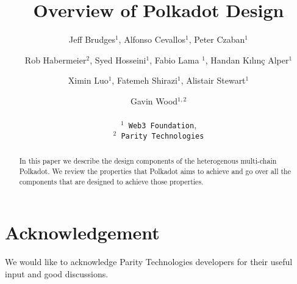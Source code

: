 \documentclass{article}
\title{Overview of Polkadot Design}
\author{
  Jeff Brudges$^1$, Alfonso Cevallos$^1$, Peter Czaban$^1$\\
  \and
  Rob Habermeier$^2$, Syed Hosseini$^1$, Fabio Lama $^1$, Handan K{\i}l{\i}n\c{c} Alper$^1$\\
  \and
  Ximin Luo$^1$, Fatemeh Shirazi$^1$, Alistair Stewart$^1$\\
  \and
  Gavin Wood$^{1,2}$\\
  \\
  \texttt{$^1$ Web3 Foundation},\\
  \texttt{$^2$ Parity Technologies}
}
\begin{document}
\maketitle

\begin{abstract}
	In this paper we describe the design components of the heterogenous multi-chain Polkadot.
We review the properties that Polkadot aims to achieve and go over all the components that are designed to achieve those properties.

\end{abstract}

\tableofcontents
\newpage




%

\section*{Acknowledgement}
We would like to acknowledge Parity Technologies developers for their useful input and good discussions.


\begin{appendix}

\end{appendix}
\end{document}
